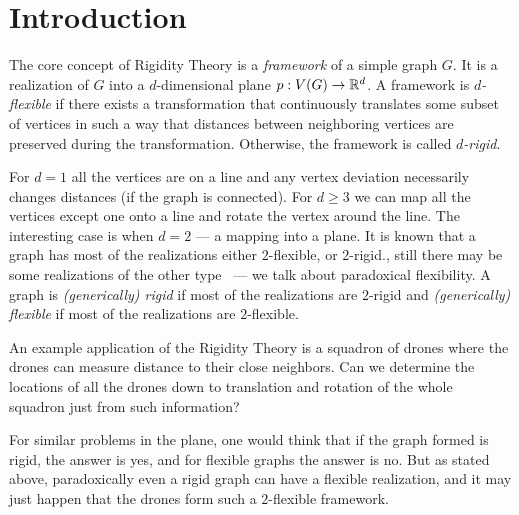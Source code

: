
\chapter{Introduction}
\setcounter{page}{1}


The core concept of Rigidity Theory is a \emph{framework} of a simple graph \(G\).
It is a realization of \(G\) into a \(d\)-dimensional plane \(p: V(G) \to \mathbb{R}^d\).
A framework is \emph{\( d \)-flexible} if there exists a transformation
that continuously translates some subset of vertices in such a way that
distances between neighboring vertices are preserved during the transformation.
Otherwise, the framework is called \emph{\( d \)-rigid}.

For \( d = 1 \) all the vertices are on a line
and any vertex deviation necessarily changes distances (if the graph is connected).
%
For \( d \ge 3 \) we can map all the vertices except one onto a line and
rotate the vertex around the line.
%
The interesting case is when \( d = 2 \) --- a mapping into a plane.
It is known that a graph has most of the realizations
either \( 2 \)-flexible, or \( 2 \)-rigid.,
still there may be some realizations of the other type~\cite{generically_rigid_graphs}
--- we talk about paradoxical flexibility.
A graph is \emph{(generically) rigid} if most of the realizations are \( 2 \)-rigid
and \emph{(generically) flexible} if most of the realizations are \( 2 \)-flexible.

An example application of the Rigidity Theory is a squadron of drones
where the drones can measure distance to their close neighbors.
Can we determine the locations of all the drones
down to translation and rotation of the whole squadron
just from such information?

For similar problems in the plane,
one would think that if the graph formed is rigid, the answer is yes, and
for flexible graphs the answer is no.
But as stated above, paradoxically even a rigid graph can have a flexible realization,
and it may just happen that the drones form such a \( 2 \)-flexible framework.

